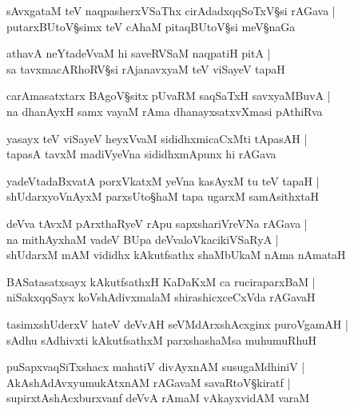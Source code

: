 \begin{shloka}
sAvxgataM teV naqpasherxVSaThx cirAdadxqqSoTxV\S si rAGava |\\
putarxBUtoV\S simx teV cAhaM pitaqBUtoV\S si meV\S naGa 
\end{shloka}

\begin{shloka}
athavA neYtadeVvaM hi saveRVSaM naqpatiH pitA |\\
sa tavxmacARhoRV\S si rAjanavxyaM teV viSayeV tapaH 
\end{shloka}

\begin{shloka}
carAmasatxtarx BAgoV\S sitx pUvaRM saqSaTxH savxyaMBuvA |\\
na dhanAyxH samx vayaM rAma dhanayxsatxvXmasi pAthiRva
\end{shloka}

\begin{shloka}
yasayx teV viSayeV heyxVvaM sididhxmicaCxMti tApasAH |\\
tapasA tavxM madiVyeVna sididhxmApunx hi rAGava 
\end{shloka}

\begin{shloka}
yadeVtadaBxvatA porxVkatxM yeVna kasAyxM tu teV tapaH |\\
shUdarxyoVnAyxM parxsUto\S haM tapa ugarxM samAsithxtaH 
\end{shloka}

\begin{shloka}
deVva tAvxM pArxthaRyeV rApu sapxshariVreVNa rAGava |\\
na mithAyxhaM vadeV BUpa deVvaloVkacikiVSaRyA |\\
shUdarxM mAM vididhx kAkutfsathx shaMbUkaM nAma nAmataH 
\end{shloka}

\begin{shloka}
BASatasatxsayx kAkutfsathxH KaDaKxM ca ruciraparxBaM |\\
niSakxqqSayx koVshAdivxmalaM shirashicxceCxVda rAGavaH 
\end{shloka}

\begin{shloka}
tasimx\R shUderxV hateV deVvAH seVMdArxshAcxginx puroVgamAH |\\
sAdhu sAdhivxti kAkutfsathxM parxshashaMsa muhumuRhuH 
\end{shloka}

\begin{shloka}
puSapxvaqSiTxshacx mahatiV divAyxnAM susugaMdhiniV |\\
AkAshAdAvxyumukAtxnAM rAGavaM savaRtoV\S kiratf |\\
supirxtAshAcxburxvanf deVvA rAmaM vAkayxvidAM varaM 
\end{shloka}

